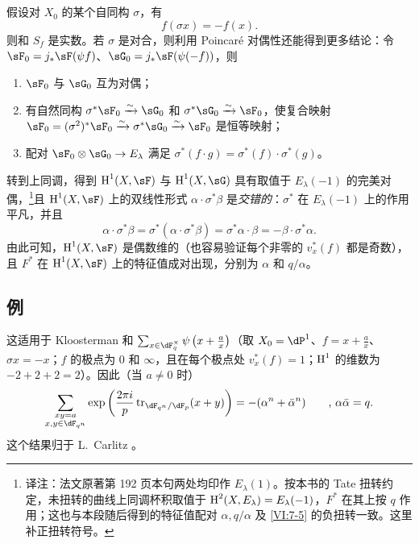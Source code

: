 \subsection{}\label{VI:3-6}

假设对 $X_0$ 的某个自同构 $\sigma$，有
\[
  f(\sigma x) = - f(x) \text{.}
\]
则和 $S_f$ 是实数。若 $\sigma$ 是对合，则利用 Poincaré 对偶性还能得到更多结论：令 $\sF_0=j_\ast \sF(\psi f)$、$\sG_0 = j_\ast \sF(\psi(-f))$，则
\begin{enumerate}[\indent a)]
  \item $\sF_0$ 与 $\sG_0$ 互为对偶；
  \item 有自然同构 $\sigma^\ast \sF_0 \iso \sG_0$ 和 $\sigma^\ast \sG_0 \iso \sF_0$，使复合映射 $\sF_0=(\sigma^2)^\ast \sF_0 \iso \sigma^\ast \sG_0 \iso \sF_0$ 是恒等映射；
  \item 配对 $\sF_0\otimes \sG_0 \to E_\lambda$ 满足 $\sigma^\ast(f\cdot g) = \sigma^\ast(f) \cdot \sigma^\ast (g)$。
\end{enumerate}

转到上同调，得到 $\h^1(X,\sF)$ 与 $\h^1(X,\sG)$ 具有取值于 $E_\lambda(-1)$ 的完美对偶，\footnote{译注：法文原著第 192 页本句两处均印作 $E_\lambda(1)$。按本书的 Tate 扭转约定，未扭转的曲线上同调杯积取值于 $\operatorname{H}^2(X,E_\lambda)=E_\lambda(-1)$，$F^\ast$ 在其上按 $q$ 作用；这也与本段随后得到的特征值配对 $\alpha,q/\alpha$ 及 \ref{VI:7-5} 的负扭转一致。这里补正扭转符号。}且 $\h^1(X,\sF)$ 上的双线性形式 $\alpha\cdot \sigma^\ast\beta$ 是\emph{交错的}：$\sigma^\ast$ 在 $E_\lambda(-1)$ 上的作用平凡，并且
\[
  \alpha\cdot \sigma^\ast \beta = \sigma^\ast(\alpha\cdot \sigma^\ast \beta) = \sigma^\ast \alpha\cdot \beta = -\beta\cdot \sigma^\ast \alpha \text{.}
\]
由此可知，$\h^1(X,\sF)$ 是偶数维的（也容易验证每个非零的 $v_x^\ast(f)$ 都是奇数），且 $F^\ast$ 在 $\h^1(X,\sF)$ 上的特征值成对出现，分别为 $\alpha$ 和 $q/\alpha$。

\subsection{例}\label{VI:3-7}

这适用于 Kloosterman 和 $\sum_{x\in \dF_q^\times} \psi\left(x+\frac a x\right)$（取 $X_0=\dP^1$、$f=x+\frac a x$、$\sigma x=-x$；$f$ 的极点为 $0$ 和 $\infty$，且在每个极点处 $v_x^\ast(f)=1$；$\operatorname{H}^1$ 的维数为 $-2+2+2=2$）。因此（当 $a\ne 0$ 时）
\[
  \sum_{\substack{x y=a \\ x,y\in \dF_{q^n}}} \exp\left(\frac{2\pi i}{p} \tr_{\dF_{q^n}/\dF_p}(x+y)\right) = -(\alpha^n+\bar\alpha^n) \qquad \text{, }\alpha\bar \alpha = q \text{.}
\]
这个结果归于 L.\ Carlitz \cite{ca69}。

